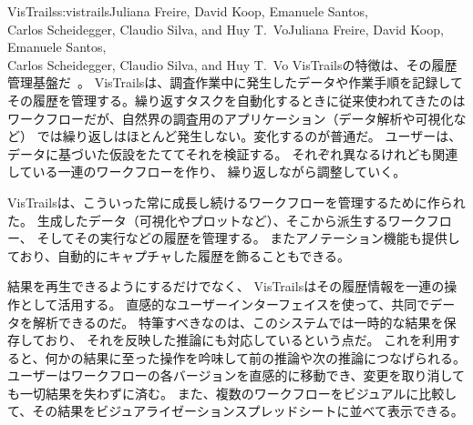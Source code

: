 \begin{aosachaptertoc}{VisTrails}{s:vistrails}{Juliana Freire, David Koop, Emanuele Santos, \\ Carlos Scheidegger, Claudio Silva, and Huy T.\ Vo}{Juliana Freire, David Koop, Emanuele Santos, \\ \hspace*{0.9cm} Carlos Scheidegger, Claudio Silva, and Huy T.\ Vo}
VisTrailsの特徴は、その履歴管理基盤だ~\cite{bib:freire:vistrails}。
VisTrailsは、調査作業中に発生したデータや作業手順を記録して
その履歴を管理する。繰り返すタスクを自動化するときに従来使われてきたのは
ワークフローだが、自然界の調査用のアプリケーション（データ解析や可視化など）
では繰り返しはほとんど発生しない。変化するのが普通だ。
ユーザーは、データに基づいた仮設をたててそれを検証する。
それぞれ異なるけれども関連している一連のワークフローを作り、
繰り返しながら調整していく。

VisTrailsは、こういった常に成長し続けるワークフローを管理するために作られた。
生成したデータ（可視化やプロットなど）、そこから派生するワークフロー、
そしてその実行などの履歴を管理する。
またアノテーション機能も提供しており、自動的にキャプチャした履歴を飾ることもできる。

結果を再生できるようにするだけでなく、
VisTrailsはその履歴情報を一連の操作として活用する。
直感的なユーザーインターフェイスを使って、共同でデータを解析できるのだ。
特筆すべきなのは、このシステムでは一時的な結果を保存しており、
それを反映した推論にも対応しているという点だ。
これを利用すると、何かの結果に至った操作を吟味して前の推論や次の推論につなげられる。
ユーザーはワークフローの各バージョンを直感的に移動でき、変更を取り消しても一切結果を失わずに済む。
また、複数のワークフローをビジュアルに比較して、その結果をビジュアライゼーションスプレッドシートに並べて表示できる。


\end{aosachaptertoc}
